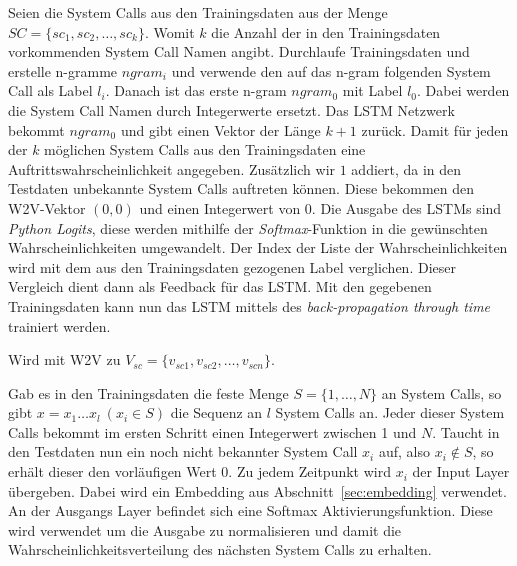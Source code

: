             Seien die System Calls aus den Trainingsdaten aus der Menge $SC = \{sc_1,sc_2,\dots,sc_k\}$.
            Womit $k$ die Anzahl der in den Trainingsdaten vorkommenden System Call Namen angibt.
            Durchlaufe Trainingsdaten und erstelle n-gramme $ngram_i$ und verwende den auf das n-gram folgenden System Call als Label $l_i$.
            Danach ist das erste n-gram $ngram_0$ mit Label $l_0$.
            Dabei werden die System Call Namen durch Integerwerte ersetzt. 
            Das \ac{LSTM} Netzwerk bekommt $ngram_0$ und gibt einen Vektor der Länge $k+1$ zurück.
            Damit für jeden der $k$ möglichen System Calls aus den Trainingsdaten eine Auftrittswahrscheinlichkeit angegeben.
            Zusätzlich wir $1$ addiert, da in den Testdaten unbekannte System Calls auftreten können.
            Diese bekommen den \ac{W2V}-Vektor $(0,0)$ und einen Integerwert von $0$. 
            Die Ausgabe des \acp{LSTM} sind \textit{Python Logits}, diese werden mithilfe der \textit{Softmax}-Funktion in die gewünschten Wahrscheinlichkeiten umgewandelt.
            Der Index der Liste der Wahrscheinlichkeiten wird mit dem aus den Trainingsdaten gezogenen Label verglichen.
            Dieser Vergleich dient dann als Feedback für das \ac{LSTM}.
            Mit den gegebenen Trainingsdaten kann nun das \ac{LSTM} mittels des \textit{back-propagation through time}  trainiert werden.

            Wird mit \ac{W2V} zu $V_{sc} = \{v_{sc1},v_{sc2},\dots,v_{scn}\}$.
            
            Gab es in den Trainingsdaten die feste Menge $S = \{1,\dots,N\}$ an System Calls, so gibt $x=x_1\dots x_l \ (x_i\in S)$ die Sequenz an $l$ System Calls an.
            Jeder dieser System Calls bekommt im ersten Schritt einen Integerwert zwischen 1 und $N$.
            Taucht in den Testdaten nun ein noch nicht bekannter System Call $x_i$ auf, also $x_i \notin S$, so erhält dieser den vorläufigen Wert 0.
            Zu jedem Zeitpunkt wird $x_i$ der Input Layer übergeben.
            Dabei wird ein Embedding aus Abschnitt~\ref{sec:embedding} verwendet. 
            An der Ausgangs Layer befindet sich eine Softmax Aktivierungsfunktion.
            Diese wird verwendet um die Ausgabe zu normalisieren und damit die Wahrscheinlichkeitsverteilung des nächsten System Calls zu erhalten.

